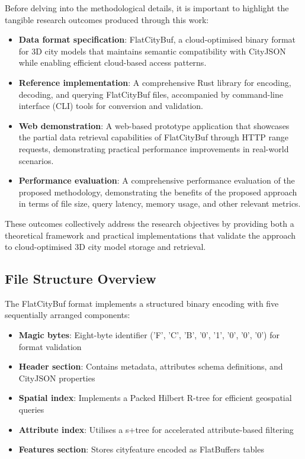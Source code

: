 Before delving into the methodological details, it is important to highlight the tangible research outcomes produced through this work:

\begin{itemize}
  \item \textbf{Data format specification}: FlatCityBuf, a cloud-optimised binary format for 3D city models that maintains semantic compatibility with CityJSON while enabling efficient cloud-based access patterns.

  \item \textbf{Reference implementation}: A comprehensive Rust library for encoding, decoding, and querying FlatCityBuf files, accompanied by command-line interface (CLI) tools for conversion and validation.

  \item \textbf{Web demonstration}: A web-based prototype application that showcases the partial data retrieval capabilities of FlatCityBuf through HTTP range requests, demonstrating practical performance improvements in real-world scenarios.

  \item \textbf{Performance evaluation}: A comprehensive performance evaluation of the proposed methodology, demonstrating the benefits of the proposed approach in terms of file size, query latency, memory usage, and other relevant metrics.
\end{itemize}

These outcomes collectively address the research objectives by providing both a theoretical framework and practical implementations that validate the approach to cloud-optimised 3D city model storage and retrieval.

\subsection{File Structure Overview}
\label{methodology:overview:file_structure}

The FlatCityBuf format implements a structured binary encoding with five sequentially arranged components:

\begin{itemize}
  \item \textbf{Magic bytes}: Eight-byte identifier ('F', 'C', 'B', '0', '1', '0', '0', '0') for format validation
  \item \textbf{Header section}: Contains metadata, attributes schema definitions, and CityJSON properties
  \item \textbf{Spatial index}: Implements a Packed Hilbert R-tree for efficient geospatial queries
  \item \textbf{Attribute index}: Utilises a \ac{s+tree} for accelerated attribute-based filtering
  \item \textbf{Features section}: Stores \ac{cityfeature} encoded as FlatBuffers tables
\end{itemize}

